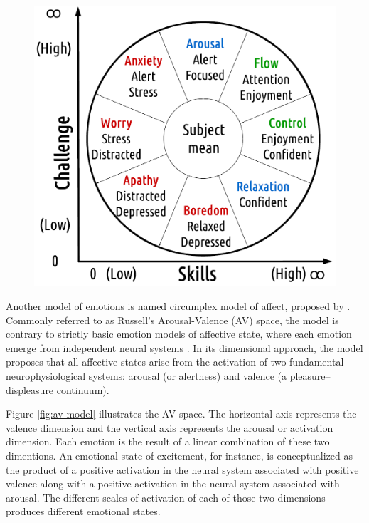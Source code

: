 \begin{figure}[h!]
    \centering
    \includegraphics[scale=0.5]{figures/flow-eight.png}
    \caption{\parencite{nakamura2014concept}}
    \label{fig:flow-eight}
\end{figure}

Another model of emotions is named circumplex model of affect, proposed by \textcite{russell1978evidence}. Commonly referred to as Russell's Arousal-Valence (AV) space, the model is contrary to strictly basic emotion models of affective state, where each emotion emerge from independent neural systems \parencite{posner2005circumplex}. In its dimensional approach, the model proposes that all affective states arise from the activation of two fundamental neurophysiological systems: arousal (or alertness) and valence (a pleasure–displeasure continuum).

Figure \ref{fig:av-model} illustrates the AV space. The horizontal axis represents the valence dimension and the vertical axis represents the arousal or activation dimension. Each emotion is the result of a linear combination of these two dimentions. An emotional state of excitement, for instance, is conceptualized as the product of a positive activation in the neural system associated with positive valence along with a positive activation in the neural system associated with arousal. The different scales of activation of each of those two dimensions produces different emotional states.

